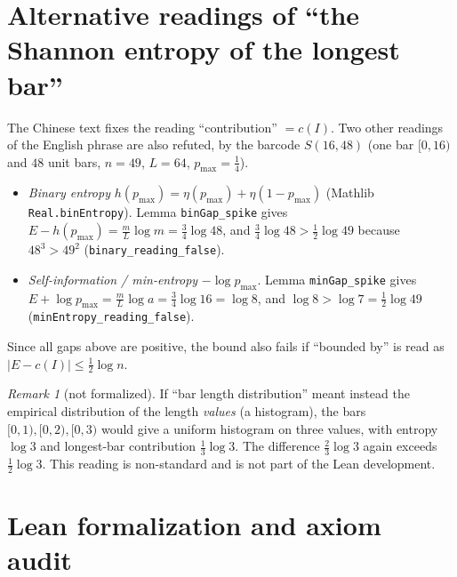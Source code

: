\documentclass[11pt]{article}
\theoremstyle{definition}
\theoremstyle{remark}
\newtheorem{remark}[theorem]{Remark}
\newcommand{\nml}{\eta}
\begin{document}
\section{Alternative readings of ``the Shannon entropy of the longest bar''}

The Chinese text fixes the reading ``contribution'' $=c(I)$. Two other readings of the English
phrase are also refuted, by the barcode $S(16,48)$ (one bar $[0,16)$ and $48$ unit bars, $n=49$,
$L=64$, $p_{\max}=\frac14$).
\begin{itemize}
\item \emph{Binary entropy} $h(p_{\max})=\nml(p_{\max})+\nml(1-p_{\max})$ (Mathlib
  \texttt{Real.binEntropy}). Lemma \texttt{binGap\_spike} gives
  $E-h(p_{\max})=\frac{m}{L}\log m=\frac34\log48$, and $\frac34\log48>\frac12\log49$ because
  $48^3>49^2$ (\texttt{binary\_reading\_false}).
\item \emph{Self-information / min-entropy} $-\log p_{\max}$. Lemma \texttt{minGap\_spike} gives
  $E+\log p_{\max}=\frac{m}{L}\log a=\frac34\log16=\log 8$, and $\log8>\log7=\frac12\log49$
  (\texttt{minEntropy\_reading\_false}).
\end{itemize}
Since all gaps above are positive, the bound also fails if ``bounded by'' is read as
$|E-c(I)|\le\frac12\log n$.

\begin{remark}[not formalized]
If ``bar length distribution'' meant instead the empirical distribution of the length \emph{values}
(a histogram), the bars $[0,1),[0,2),[0,3)$ would give a uniform histogram on three values, with
entropy $\log3$ and longest-bar contribution $\frac13\log3$. The difference $\frac23\log3$ again
exceeds $\frac12\log3$. This reading is non-standard and is not part of the Lean development.
\end{remark}

\section{Lean formalization and axiom audit}
\end{document}
